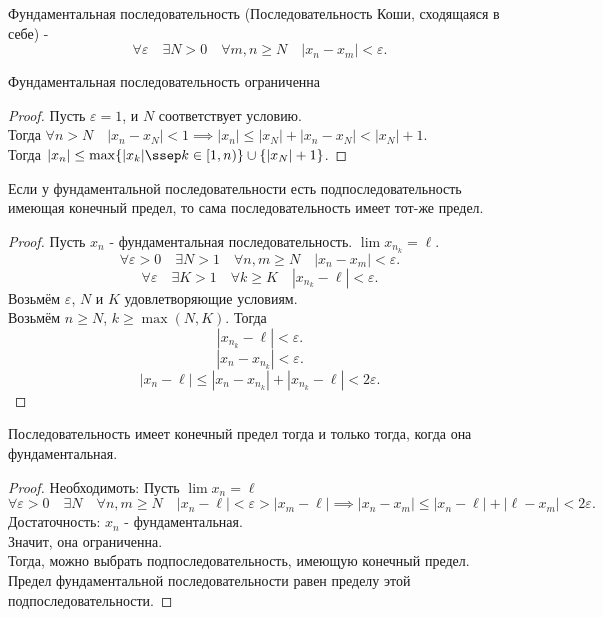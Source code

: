 \documentclass[11pt, oneside]{article}   	%
\begin{document}
    \begin{definition}
        Фундаментальная последовательность (Последовательность Коши, сходящаяся в себе) - 
        \[ \forall{\varepsilon}\quad \exists{N>0}\quad \forall{m,n\ge N}\quad |x_n-x_m|<\varepsilon .\] 
    \end{definition}
    \begin{dlemma}
        Фундаментальная последовательность ограниченна
        \begin{proof}
            Пусть $\varepsilon = 1$, и  $N$ соответствует условию.\\
            Тогда  $\forall{n>N}\quad |x_n - x_N| < 1 \implies |x_n| \le |x_N| + |x_n-x_N| < |x_N| + 1$.\\
            Тогда $|x_n| \le \max \{|x_k| \ssep k\in \left[1, n\right)\} \cup \{|x_N| + 1\}  $.
        \end{proof}
    \end{dlemma}
    \begin{dlemma}
        Если у фундаментальной последовательности есть подпоследовательность имеющая конечный предел, то сама последовательность имеет тот-же предел.\\
        \begin{proof}
            Пусть $x_n$ - фундаментальная последовательность. $\lim x_{n_k} = \ell$.
            \[ \forall{\varepsilon>0}\quad \exists{N>1}\quad \forall{n,m\ge N}\quad |x_n-x_m|<\varepsilon .\]
            \[ \forall{\varepsilon}\quad \exists{K>1}\quad \forall{k\ge K}\quad |x_{n_k}-\ell| < \varepsilon .\]
            Возьмём $\varepsilon$, $N$ и $K$ удовлетворяющие условиям.\\
            Возьмём $n\ge N$, $k \ge \max\left( N, K \right) $. Тогда
            \[ |x_{n_k}-\ell| < \varepsilon .\]
            \[ |x_n-x_{n_k}| < \varepsilon .\]
            \[ |x_n-\ell| \le |x_n -x_{n_k}|+|x_{n_k}-\ell| < 2\varepsilon .\] 
        \end{proof}
    \end{dlemma}
    \begin{theorem}
        Последовательность имеет конечный предел тогда и только тогда, когда она фундаментальная.\\
        \begin{proof}
            Необходимоть:
            Пусть $\lim x_n = \ell$
             \[ \forall{\varepsilon>0}\quad \exists{N}\quad \forall{n, m\ge N}\quad |x_n-\ell| < \varepsilon > |x_m-\ell| \implies |x_n-x_m| \le |x_n-\ell|+|\ell-x_m| < 2\varepsilon .\]
            Достаточность:
            $x_n$ - фундаментальная.\\
            Значит, она ограниченна.\\
            Тогда, можно выбрать подпоследовательность, имеющую конечный предел.\\
            Предел фундаментальной последовательности равен пределу этой подпоследовательности.
        \end{proof}
    \end{theorem}
\end{document}
